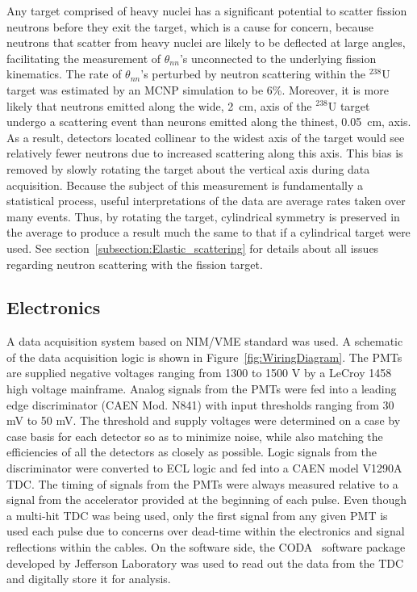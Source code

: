 Any target comprised of heavy nuclei has a significant potential to scatter fission neutrons before they exit the target, which is a cause for concern, because neutrons that scatter from heavy nuclei are likely to be deflected at large angles, facilitating the measurement of $\theta_{nn}$'s unconnected to the underlying fission kinematics.
The rate of $\theta_{nn}$'s perturbed by neutron scattering within the $^{238}$U target was estimated by an MCNP simulation to be 6\%.
Moreover, it is more likely that neutrons emitted along the wide, 2~cm, axis of the $^{238}$U target undergo a scattering event than neurons emitted along the thinest, 0.05~cm, axis.
As a result, detectors located collinear to the widest axis of the target would see relatively fewer neutrons due to increased scattering along this axis. 
This bias is removed by slowly rotating the target about the vertical axis during data acquisition.
Because the subject of this measurement is fundamentally a statistical process, useful interpretations of the data are average rates taken over many events.
Thus, by rotating the target, cylindrical symmetry is preserved in the average to produce a result much the same to that if a cylindrical target were used.
See section~\ref{subsection:Elastic_scattering} for details about all issues regarding neutron scattering with the fission target.  

\subsection{Electronics}
A data acquisition system based on NIM/VME standard was used.
A schematic of the data acquisition logic is shown in Figure~\ref{fig:WiringDiagram}.
The PMTs are supplied negative voltages ranging from 1300 to 1500 V by a LeCroy 1458 high voltage mainframe.
Analog signals from the PMTs were fed into a leading edge discriminator (CAEN Mod. N841) with input thresholds ranging from 30 mV to 50 mV.
The threshold and supply voltages were determined on a case by case basis for each detector so as to minimize noise, while also matching the efficiencies of all the detectors as closely as possible.
Logic signals from the discriminator were converted to ECL logic and fed into a CAEN model V1290A TDC.
The timing of signals from the PMTs were always measured relative to a signal from the accelerator provided at the beginning of each pulse.
Even though a multi-hit TDC was being used, only the first signal from any given PMT is used each pulse due to concerns over dead-time within the electronics and signal reflections within the cables.
On the software side, the CODA~\cite{CODA} software package developed by Jefferson Laboratory was used to read out the data from the TDC and digitally store it for analysis.

